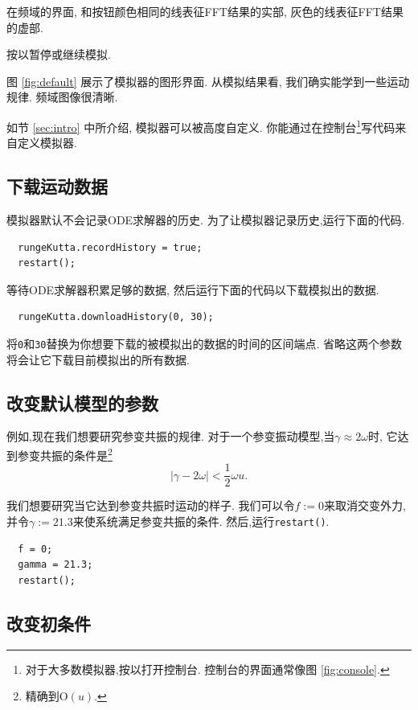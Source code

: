 \documentclass[12pt]{article}
\begin{document}
在频域的界面,
和按钮颜色相同的线表征FFT结果的实部,
灰色的线表征FFT结果的虚部.

按\LKeySpace 以暂停或继续模拟.

图 \ref{fig:default} 展示了模拟器的图形界面.
从模拟结果看,
我们确实能学到一些运动规律.
频域图像很清晰.

如节 \ref{sec:intro} 中所介绍, 模拟器可以被高度自定义.
你能通过在控制台\footnote{
  对于大多数模拟器,按以打开控制台.
  控制台的界面通常像图 \ref{fig:console}.
}写代码来自定义模拟器.

\subsection{下载运动数据}

模拟器默认不会记录ODE求解器的历史.
为了让模拟器记录历史,运行下面的代码.

\begin{verbatim}
  rungeKutta.recordHistory = true;
  restart();
\end{verbatim}

等待ODE求解器积累足够的数据,
然后运行下面的代码以下载模拟出的数据.

\begin{verbatim}
  rungeKutta.downloadHistory(0, 30);
\end{verbatim}

将\texttt{0}和\texttt{30}替换为你想要下载的被模拟出的数据的时间的区间端点.
省略这两个参数将会让它下载目前模拟出的所有数据.

\subsection{改变默认模型的参数}

例如,现在我们想要研究参变共振的规律.
对于一个参变振动模型,当$\gamma\approx2\omega$时,
它达到参变共振的条件是\footnote{
  精确到$\mathrm O\left(u\right)$.
} \cite[p. 82]{landau1976mechanics}
\begin{equation}
  \left|\gamma-2\omega\right|<\frac12\omega u.
\end{equation}

我们想要研究当它达到参变共振时运动的样子.
我们可以令$f:=0$来取消交变外力,
并令$\gamma:=21.3$来使系统满足参变共振的条件.
然后,运行\texttt{restart()}.

\begin{verbatim}
  f = 0;
  gamma = 21.3;
  restart();
\end{verbatim}

\subsection{改变初条件}
\end{document}
